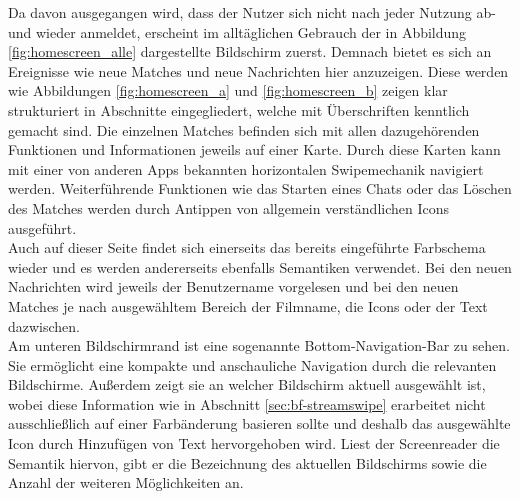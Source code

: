 
Da davon ausgegangen wird, dass der Nutzer sich nicht nach jeder Nutzung ab- und wieder anmeldet, erscheint im alltäglichen Gebrauch der in Abbildung \ref{fig:homescreen_alle} dargestellte Bildschirm zuerst. Demnach bietet es sich an Ereignisse wie neue Matches und neue Nachrichten hier anzuzeigen. Diese werden wie Abbildungen \ref{fig:homescreen_a} und \ref{fig:homescreen_b} zeigen klar strukturiert in Abschnitte eingegliedert, welche mit Überschriften kenntlich gemacht sind. Die einzelnen Matches befinden sich mit allen dazugehörenden Funktionen und Informationen jeweils auf einer Karte. Durch diese Karten kann mit einer von anderen \mbox{Apps} bekannten horizontalen Swipemechanik navigiert werden. Weiterführende Funktionen wie das Starten eines Chats oder das Löschen des Matches werden durch  Antippen von allgemein verständlichen Icons ausgeführt. \\
Auch auf dieser Seite findet sich einerseits das bereits eingeführte Farbschema wieder und es werden andererseits ebenfalls Semantiken verwendet. Bei den neuen Nachrichten wird jeweils der Benutzername vorgelesen und bei den neuen Matches je nach ausgewähltem Bereich der Filmname, die Icons oder der Text dazwischen.\\
Am unteren Bildschirmrand ist eine sogenannte Bottom-Navigation-Bar zu sehen. Sie ermöglicht eine kompakte und anschauliche Navigation durch die relevanten Bildschirme. Außerdem zeigt sie an welcher Bildschirm aktuell ausgewählt ist, wobei diese Information wie in Abschnitt \ref{sec:bf-streamswipe} erarbeitet nicht ausschließlich auf einer Farbänderung basieren sollte und deshalb das ausgewählte Icon durch Hinzufügen von Text hervorgehoben wird. Liest der Screenreader die Semantik hiervon, gibt er die Bezeichnung des aktuellen Bildschirms sowie die Anzahl der weiteren Möglichkeiten an. \\

